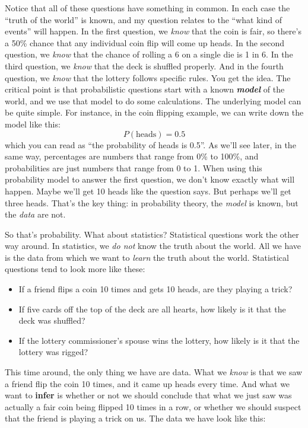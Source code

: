 \documentclass[
  11pt,
  a4paper,
  twoside,symmetric,openright]{book}
\providecommand{\tightlist}{%
  \setlength{\itemsep}{0pt}\setlength{\parskip}{0pt}}
\theoremstyle{break}
\theoremstyle{break}
\begin{document}
Notice that all of these questions have something in common. In each case the ``truth of the world'' is known, and my question relates to the ``what kind of events'' will happen. In the first question, we \emph{know} that the coin is fair, so there's a 50\% chance that any individual coin flip will come up heads. In the second question, we \emph{know} that the chance of rolling a 6 on a single die is 1 in 6. In the third question, we \emph{know} that the deck is shuffled properly. And in the fourth question, we \emph{know} that the lottery follows specific rules. You get the idea. The critical point is that probabilistic questions start with a known \textbf{\emph{model}} of the world, and we use that model to do some calculations. The underlying model can be quite simple. For instance, in the coin flipping example, we can write down the model like this:
\[
P(\mbox{heads}) = 0.5
\]
which you can read as ``the probability of heads is 0.5''. As we'll see later, in the same way, percentages are numbers that range from 0\% to 100\%, and probabilities are just numbers that range from 0 to 1. When using this probability model to answer the first question, we don't know exactly what will happen. Maybe we'll get 10 heads like the question says. But perhaps we'll get three heads. That's the key thing: in probability theory, the \emph{model} is known, but the \emph{data} are not.

So that's probability. What about statistics? Statistical questions work the other way around. In statistics, we \emph{do not} know the truth about the world. All we have is the data from which we want to \emph{learn} the truth about the world. Statistical questions tend to look more like these:

\begin{itemize}
\tightlist
\item
  If a friend flips a coin 10 times and gets 10 heads, are they playing a trick?
\item
  If five cards off the top of the deck are all hearts, how likely is it that the deck was shuffled?
\item
  If the lottery commissioner's spouse wins the lottery, how likely is it that the lottery was rigged?
\end{itemize}

This time around, the only thing we have are data. What we \emph{know} is that we saw a friend flip the coin 10 times, and it came up heads every time. And what we want to \textbf{infer} is whether or not we should conclude that what we just saw was actually a fair coin being flipped 10 times in a row, or whether we should suspect that the friend is playing a trick on us. The data we have look like this:
\end{document}
